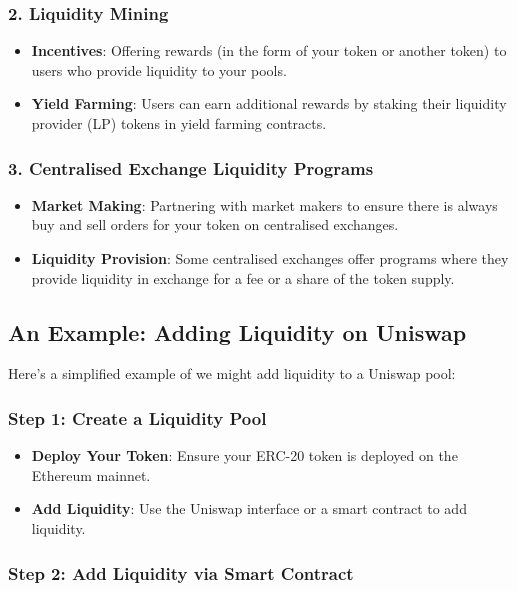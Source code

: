\documentclass{tufte-handout}
\begin{document}
\subsubsection*{2. Liquidity Mining}
\begin{itemize}
    \item \textbf{Incentives}: Offering rewards (in the form of your token or another token) to users who provide liquidity to your pools.
    \item \textbf{Yield Farming}: Users can earn additional rewards by staking their liquidity provider (LP) tokens in yield farming contracts.
\end{itemize}

\subsubsection*{3. Centralised Exchange Liquidity Programs}
\begin{itemize}
    \item \textbf{Market Making}: Partnering with market makers to ensure there is always buy and sell orders for your token on centralised exchanges.
    \item \textbf{Liquidity Provision}: Some centralised exchanges offer programs where they provide liquidity in exchange for a fee or a share of the token supply.
\end{itemize}

\subsection*{An Example: Adding Liquidity on Uniswap}

Here's a simplified example of we might add liquidity to a Uniswap pool:

\subsubsection*{Step 1: Create a Liquidity Pool}
\begin{itemize}
    \item \textbf{Deploy Your Token}: Ensure your ERC-20 token is deployed on the Ethereum mainnet.
    \item \textbf{Add Liquidity}: Use the Uniswap interface or a smart contract to add liquidity.
\end{itemize}

\subsubsection*{Step 2: Add Liquidity via Smart Contract}
\end{document}
